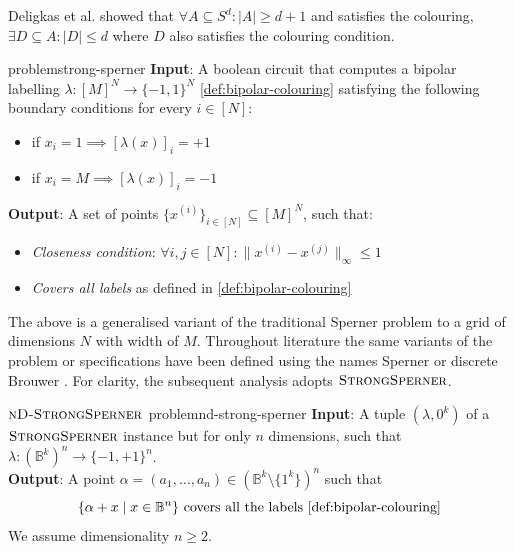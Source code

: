 Deligkas et al. \cite{deligkas_PureCircuitTightInapproximability_2024, deligkas_ConstantInapproximabilityPPA_2022} showed that
$\forall A \subseteq S^d: |A| \geq d+1$ and satisfies the colouring, $\exists D \subseteq A: |D| \leq d$ where $D$ also satisfies
the colouring condition.

\begin{definitionbox}{ problem}{strong-sperner}
	\textbf{Input}: A boolean circuit that computes a bipolar labelling $\lambda: [M]^N \to \{-1, 1\}^N$ \ref{def:bipolar-colouring}
	satisfying the following boundary conditions for every $i \in [N]$:
	\begin{itemize}
		\item if $x_i = 1 \implies [\lambda(x)]_i = +1$
		\item if $x_i = M \implies [\lambda(x)]_i = -1$
	\end{itemize}
	\textbf{Output}: A set of points $\{x^{(i)}\}_{i \in [N]} \subseteq [M]^{N}$, such that:
	\begin{itemize}
		\item \textit{Closeness condition}: $\forall i,j \in [N]: \|x^{(i)} - x^{(j)}\|_{\infty} \leq 1$
		\item \textit{Covers all labels} as defined in \ref{def:bipolar-colouring}
	\end{itemize}
\end{definitionbox}

The above is a generalised variant of the traditional Sperner problem to
a grid of dimensions $N$ with width of $M$.
Throughout literature the same variants of the problem or specifications
have been defined using the names Sperner or discrete Brouwer \cite{chen_SettlingComplexityComputing_2009, chen_Complexity2DDiscrete_2009, daskalakis_ComplexityComputingNash_2006, deligkas_PureCircuitTightInapproximability_2024}.
For clarity, the subsequent analysis adopts $\textsc{StrongSperner}$.

\begin{definitionbox}{$\textnormal{\textsc{nD-StrongSperner}}$ problem}{nd-strong-sperner}
	\textbf{Input}: A tuple $(\lambda,0^k)$ of a $\textnormal{\textsc{StrongSperner}}$ instance but for only $n$ dimensions, such that
	$\lambda : (\mathbb{B}^k)^n \to \{-1, +1\}^n$.\\
	\textbf{Output}: A point $\alpha = (a_1, \hdots, a_n) \in (\mathbb{B}^k \setminus \{1^k\})^n$ such that
	$$
		\{\alpha + x \mid x \in \mathbb{B}^n\} \text{ covers all the labels \ref{def:bipolar-colouring}}
	$$
	We assume dimensionality $n \geq 2$.
\end{definitionbox}

